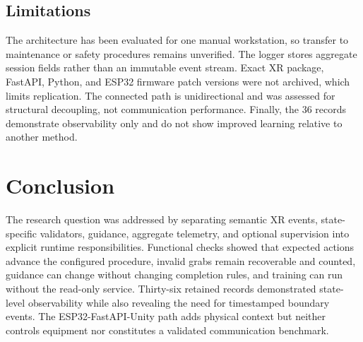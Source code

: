 \documentclass[conference]{IEEEtran}
\begin{document}
\subsection{Limitations}

The architecture has been evaluated for one manual workstation, so transfer to maintenance or safety procedures remains unverified. The logger stores aggregate session fields rather than an immutable event stream. Exact XR package, FastAPI, Python, and ESP32 firmware patch versions were not archived, which limits replication. The connected path is unidirectional and was assessed for structural decoupling, not communication performance. Finally, the 36 records demonstrate observability only and do not show improved learning relative to another method.

\section{Conclusion}

The research question was addressed by separating semantic XR events, state-specific validators, guidance, aggregate telemetry, and optional supervision into explicit runtime responsibilities. Functional checks showed that expected actions advance the configured procedure, invalid grabs remain recoverable and counted, guidance can change without changing completion rules, and training can run without the read-only service. Thirty-six retained records demonstrated state-level observability while also revealing the need for timestamped boundary events. The ESP32-FastAPI-Unity path adds physical context but neither controls equipment nor constitutes a validated communication benchmark.




\end{document}
